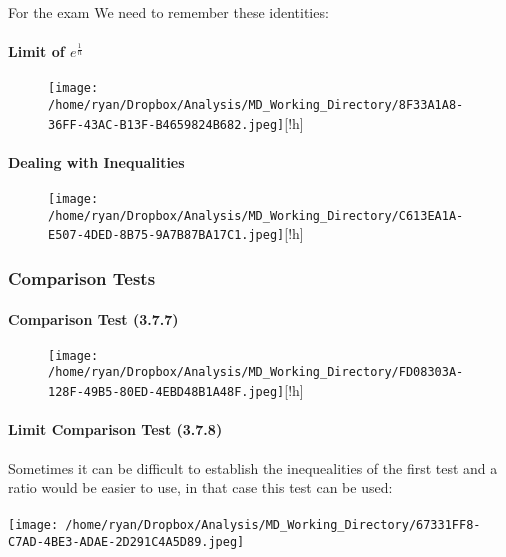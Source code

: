 \documentclass[
]{article}
\let\oldparagraph\paragraph
\renewcommand{\paragraph}[1]{\oldparagraph{#1}\mbox{}}
\begin{document}
For the exam We need to remember these identities:

\hypertarget{header-n3243}{%
\paragraph{\texorpdfstring{Limit of
\(e^\frac{1}{n}\)}{Limit of e\^{}\textbackslash frac\{1\}\{n\}}}\label{header-n3243}}

\begin{figure}
\centering
\texttt{[image: /home/ryan/Dropbox/Analysis/MD\_Working\_Directory/8F33A1A8-36FF-43AC-B13F-B4659824B682.jpeg]}[!h]
\caption{}
\end{figure}

\hypertarget{header-n3245}{%
\paragraph{Dealing with Inequalities}\label{header-n3245}}

\begin{figure}
\centering
\texttt{[image: /home/ryan/Dropbox/Analysis/MD\_Working\_Directory/C613EA1A-E507-4DED-8B75-9A7B87BA17C1.jpeg]}[!h]
\caption{}
\end{figure}

\newpage

\hypertarget{header-n3247}{%
\subsubsection{Comparison Tests}\label{header-n3247}}

\hypertarget{header-n3248}{%
\paragraph{Comparison Test (3.7.7)}\label{header-n3248}}

\begin{figure}
\centering
\texttt{[image: /home/ryan/Dropbox/Analysis/MD\_Working\_Directory/FD08303A-128F-49B5-80ED-4EBD48B1A48F.jpeg]}[!h]
\caption{}
\end{figure}

\hypertarget{header-n3250}{%
\paragraph{Limit Comparison Test (3.7.8)}\label{header-n3250}}

Sometimes it can be difficult to establish the inequealities of the
first test and a ratio would be easier to use, in that case this test
can be used:
\ \\
\ \\
\texttt{[image: /home/ryan/Dropbox/Analysis/MD\_Working\_Directory/67331FF8-C7AD-4BE3-ADAE-2D291C4A5D89.jpeg]}
\end{document}
